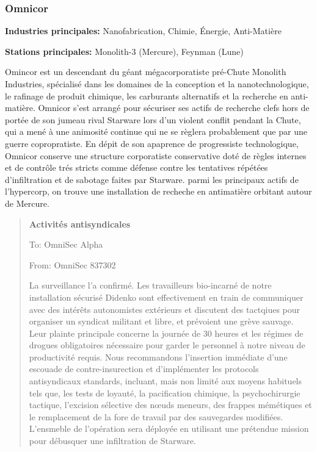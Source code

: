 \subsubsection{Omnicor} \label{sec:omnicor} 

\textbf{Industries principales:} Nanofabrication, Chimie, Énergie, Anti-Matière 

\textbf{Stations principales:} Monolith-3 (Mercure), Feynman (Lune) 

Omincor est un descendant du géant mégacorporatiste pré-Chute Monolith Industries, spécialisé dans les domaines de la conception et la nanotechnologique, le rafinage de produit chimique, les carburants alternatifs et la recherche en anti-matière. Omnicor s'est arrangé pour sécuriser ses actifs de recherche clefs hors de portée de son jumeau rival Starware lors d'un violent conflit pendant la Chute, qui a mené à une animosité continue qui ne se règlera probablement que par une guerre copropratiste. En dépit de son apaprence de progressiste technologique, Omnicor conserve une structure corporatiste conservative doté de règles internes et de contrôle trés stricts  comme défense contre les tentatives répétées d'infiltration et de sabotage faites par Starware. parmi les principaux actifs de l'hypercorp, on trouve une installation de recheche en antimatière orbitant autour de Mercure. 

\begin{quotation} \textbf{Activités antisyndicales} 

To: OmniSec Alpha 

From: OmniSec 837302 

La surveillance l'a confirmé. Les travailleurs bio-incarné de notre installation sécurisé Didenko sont effectivement en train de communiquer avec des intérêts autonomistes extérieurs et discutent des tactqiues pour organiser un syndicat militant et libre, et prévoient une grève sauvage. Leur plainte principale concerne la journée de 30 heures et les régimes de drogues obligatoires nécessaire pour garder le personnel à notre niveau de productivité requis. Nous recommandons l'insertion immédiate d'une escouade de contre-insurection et d'implémenter les protocols antisyndicaux standards, incluant, mais non limité aux moyens habituels tels que, les tests de loyauté, la pacification chimique, la psychochirurgie tactique, l'excision sélective des nœuds meneurs, des frappes mémétiques et le remplacement de la fore de travail par des sauvegardes modifiées. L'ensmeble de l'opération sera déployée en utilisant une prétendue mission pour débusquer une infiltration de Starware. \end{quotation} 

